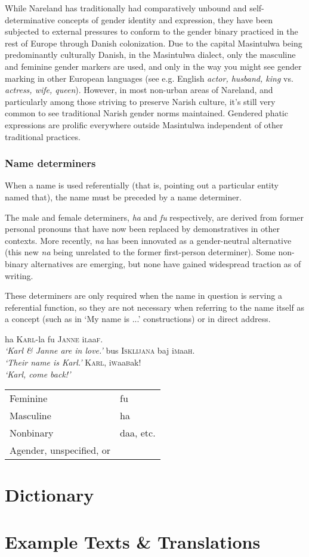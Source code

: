 \documentclass[a4paper,10pt,twoside,openright]{memoir}
\newcommand{\famwordold}[5]{#1\textsc{#2}#3\textsc{#4}#5}
\begin{document}
While Nareland has traditionally had comparatively unbound and self-determinative concepts of gender identity and expression, they have been subjected to external pressures to conform to the gender binary practiced in the rest of Europe through Danish colonization. Due to the capital Masintulwa being predominantly culturally Danish, in the Masintulwa dialect, only the masculine and feminine gender markers are used, and only in the way you might see gender marking in other European languages (see e.g. English \textit{actor, husband, king} vs. \textit{actress, wife, queen}). However, in most non-urban areas of Nareland, and particularly among those striving to preserve Narish culture, it's still very common to see traditional Narish gender norms maintained. Gendered phatic expressions are prolific everywhere outside Masintulwa independent of other traditional practices.

\section{Name determiners}

When a name is used referentially (that is, pointing out a particular entity named that), the name must be preceded by a name determiner.

The male and female determiners, \textit{ha} and \textit{fu} respectively, are derived from former personal pronouns that have now been replaced by demonstratives in other contexts. More recently, \textit{na} has been innovated as a gender-neutral alternative (this new \textit{na} being unrelated to the former first-person determiner). Some non-binary alternatives are emerging, but none have gained widespread traction as of writing.

These determiners are only required when the name in question is serving a referential function, so they are not necessary when referring to the name itself as a concept (such as in `My name is ...' constructions) or in direct address.

\pex
\a
ha \textsc{Karl}-la fu \textsc{Janne} \famwordold{i}{l}{aa}{f}{}.\\
\textit{`Karl \& Janne are in love.'}
\a
bus \textsc{Isklijana} baj \famwordold{i}{m}{aa}{h}{}.\\
\textit{`Their name is Karl.'}
\a
\textsc{Karl}, \famwordold{i}{w}{aa}{b}{ak}!\\
\textit{`Karl, come back!'}
\xe

\begin{table}[ht]
    \begin{tabular}{ll}
        Feminine & fu \\
        Masculine & ha \\
        Nonbinary & daa, etc. \\
        Agender, unspecified, or 
    \end{tabular}
\end{table}



\part{Dictionary}



\part{Example Texts \& Translations}

%
\end{document}
